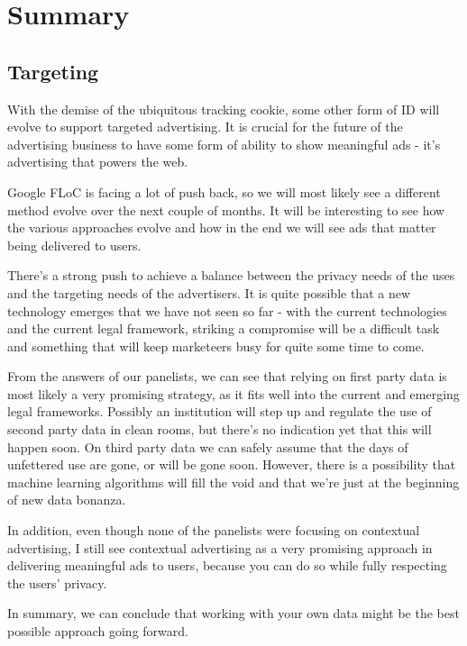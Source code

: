 %
%

\pagebreak
\section{Summary}

\onehalfspacing

\subsection{Targeting}

With the demise of the ubiquitous tracking cookie, some other form of ID will evolve to support targeted advertising. It is crucial for the future of the advertising business to have some form of ability to show meaningful ads - it's advertising that powers the web.

Google FLoC is facing a lot of push back, so we will most likely see a different method evolve over the next couple of months. It will be interesting to see how the various approaches evolve and how in the end we will see ads that matter being delivered to users.

There's a strong push to achieve a balance between the privacy needs of the uses and the targeting needs of the advertisers. It is quite possible that a new technology emerges that we have not seen so far - with the current technologies and the current legal framework, striking a compromise will be a difficult task and something that will keep marketeers busy for quite some time to come.

From the answers of our panelists, we can see that relying on first party data is most likely a very promising strategy, as it fits well into the current and emerging legal frameworks. Possibly an institution will step up and regulate the use of second party data in clean rooms, but there's no indication yet that this will happen soon. On third party data we can safely assume that the days of unfettered use are gone, or will be gone soon. However, there is a possibility that machine learning algorithms will fill the void and that we're just at the beginning of new data bonanza.

In addition, even though none of the panelists were focusing on contextual advertising, I still see contextual advertising as a very promising approach in delivering meaningful ads to users, because you can do so while fully respecting the users' privacy.

In summary, we can conclude that working with your own data might be the best possible approach going forward.

